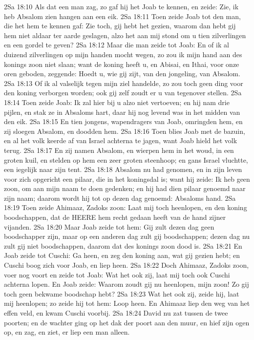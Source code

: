 2Sa 18:10  Als dat een man zag, zo gaf hij het Joab te kennen, en zeide: Zie, ik heb Absalom zien hangen aan een eik.
2Sa 18:11  Toen zeide Joab tot den man, die het hem te kennen gaf: Zie toch, gij hebt het gezien, waarom dan hebt gij hem niet aldaar ter aarde geslagen, alzo het aan mij stond om u tien zilverlingen en een gordel te geven?
2Sa 18:12  Maar die man zeide tot Joab: En of ik al duizend zilverlingen op mijn handen mocht wegen, zo zou ik mijn hand aan des konings zoon niet slaan; want de koning heeft u, en Abisai, en Ithai, voor onze oren geboden, zeggende: Hoedt u, wie gij zijt, van den jongeling, van Absalom.
2Sa 18:13  Of ik al valselijk tegen mijn ziel handelde, zo zou toch geen ding voor den koning verborgen worden; ook gij zelf zoudt er u van tegenover stellen.
2Sa 18:14  Toen zeide Joab: Ik zal hier bij u alzo niet vertoeven; en hij nam drie pijlen, en stak ze in Absaloms hart, daar hij nog levend was in het midden van den eik.
2Sa 18:15  En tien jongens, wapendragers van Joab, omringden hem, en zij sloegen Absalom, en doodden hem.
2Sa 18:16  Toen blies Joab met de bazuin, en al het volk keerde af van Israel achterna te jagen, want Joab hield het volk terug.
2Sa 18:17  En zij namen Absalom, en wierpen hem in het woud, in een groten kuil, en stelden op hem een zeer groten steenhoop; en gans Israel vluchtte, een iegelijk naar zijn tent.
2Sa 18:18  Absalom nu had genomen, en in zijn leven voor zich opgericht een pilaar, die in het koningsdal is; want hij zeide: Ik heb geen zoon, om aan mijn naam te doen gedenken; en hij had dien pilaar genoemd naar zijn naam; daarom wordt hij tot op dezen dag genoemd: Absaloms hand.
2Sa 18:19  Toen zeide Ahimaaz, Zadoks zoon: Laat mij toch heenlopen, en den koning boodschappen, dat de HEERE hem recht gedaan heeft van de hand zijner vijanden.
2Sa 18:20  Maar Joab zeide tot hem: Gij zult dezen dag geen boodschapper zijn, maar op een anderen dag zult gij boodschappen; dezen dag nu zult gij niet boodschappen, daarom dat des konings zoon dood is.
2Sa 18:21  En Joab zeide tot Cuschi: Ga heen, en zeg den koning aan, wat gij gezien hebt; en Cuschi boog zich voor Joab, en liep heen.
2Sa 18:22  Doch Ahimaaz, Zadoks zoon, voer nog voort en zeide tot Joab: Wat het ook zij, laat mij toch ook Cuschi achterna lopen. En Joab zeide: Waarom zoudt gij nu heenlopen, mijn zoon! Zo gij toch geen bekwame boodschap hebt?
2Sa 18:23  Wat het ook zij, zeide hij, laat mij heenlopen; zo zeide hij tot hem: Loop heen. En Ahimaaz liep den weg van het effen veld, en kwam Cuschi voorbij.
2Sa 18:24  David nu zat tussen de twee poorten; en de wachter ging op het dak der poort aan den muur, en hief zijn ogen op, en zag, en ziet, er liep een man alleen.
